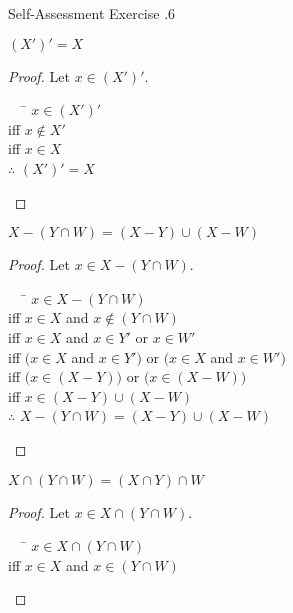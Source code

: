 \documentclass[\main/notes.tex]{subfiles}
\begin{document}
			\begin{exercise}{Self-Assessment Exercise \thechapter.6}
				\begin{multicols}{2}
					\begin{questions}[label=(\alph*), itemsep=0.5em]
						\item $(X')' = X$
							\begin{answer}
								\begin{proof}
									Let $x \in (X')'$.
									\begin{tabbing}
										$\quad$ \= $x \in (X')'$\\
										iff \> $x \notin X'$\\
										iff \> $x \in X$\\
										$\therefore$ \> $(X')' = X$
									\end{tabbing}
								\end{proof}
							\end{answer}
						\item $X - (Y \cap W) = (X - Y) \cup (X - W)$
							\begin{answer}
								\begin{proof}
									Let $x \in X - (Y \cap W)$.
									\begin{tabbing}
										$\quad$ \= $x \in X - (Y \cap W)$\\
										iff \> $x \in X$ and $x \notin (Y \cap W)$\\
										iff \> $x \in X$ and $x \in Y'$ or $x \in W'$\\
										iff \> $\bigl(x \in X$ and $x \in Y'\bigr)$ or $\bigl(x \in X$ and $x \in W'\bigr)$\\
										iff \> $\bigl(x \in (X - Y)\bigr)$ or $\bigl(x \in (X - W)\bigr)$\\
										iff \> $x \in (X - Y) \cup (X - W)$\\
										$\therefore$ \> $X - (Y \cap W) = (X - Y) \cup (X - W)$
									\end{tabbing}
								\end{proof}
							\end{answer}
						\columnbreak
						\item $X \cap (Y \cap W) = (X \cap Y) \cap W$
							\begin{answer}
								\begin{proof}
									Let $x \in X \cap (Y \cap W)$.
									\begin{tabbing}
										$\quad$ \= $x \in X \cap (Y \cap W)$\\
										iff \> $x \in X$ and $x \in (Y \cap W)$\\

\end{tabbing}
\end{proof}
\end{answer}
\end{questions}
\end{multicols}
\end{exercise}
\end{document}
